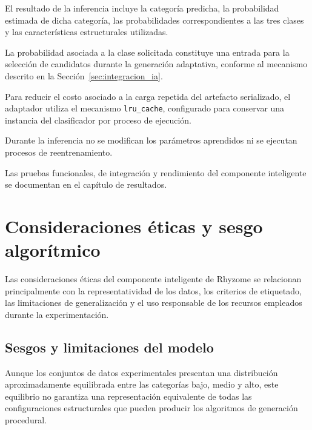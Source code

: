 El resultado de la inferencia incluye la categoría predicha, la probabilidad estimada de dicha categoría, las probabilidades correspondientes a las tres clases y las características estructurales utilizadas.

La probabilidad asociada a la clase solicitada constituye una entrada para la selección de candidatos durante la generación adaptativa, conforme al mecanismo descrito en la Sección~\ref{sec:integracion_ia}.

Para reducir el costo asociado a la carga repetida del artefacto serializado, el adaptador utiliza el mecanismo \texttt{lru\_cache}, configurado para conservar una instancia del clasificador por proceso de ejecución.

Durante la inferencia no se modifican los parámetros aprendidos ni se ejecutan procesos de reentrenamiento.

Las pruebas funcionales, de integración y rendimiento del componente inteligente se documentan en el capítulo de resultados.

\FloatBarrier


\section{Consideraciones éticas y sesgo algorítmico}
\label{sec:etica_ia}

Las consideraciones éticas del componente inteligente de Rhyzome se relacionan principalmente con la representatividad de los datos, los criterios de etiquetado, las limitaciones de generalización y el uso responsable de los recursos empleados durante la experimentación.


\subsection{Sesgos y limitaciones del modelo}
\label{subsec:sesgos_dataset_etiquetado}
\label{subsec:limitaciones_modelo_complejidad}
\label{subsec:limitaciones_generalizacion}

Aunque los conjuntos de datos experimentales presentan una distribución aproximadamente equilibrada entre las categorías bajo, medio y alto, este equilibrio no garantiza una representación equivalente de todas las configuraciones estructurales que pueden producir los algoritmos de generación procedural.

